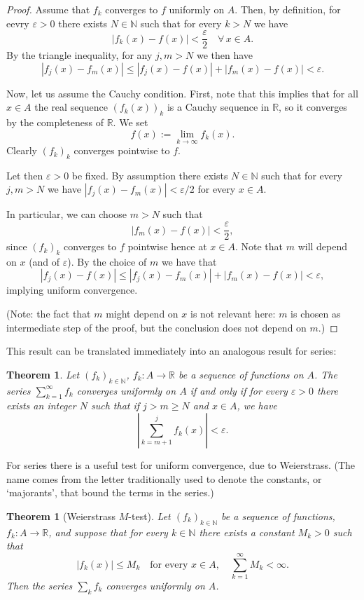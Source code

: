 \documentclass[a4paper,reqno]{amsart}
\numberwithin{equation}{section}
\newtheorem{theorem}[definition]{Theorem}
\def\N{\mathbb{N}}
\def\R{\mathbb{R}}
\begin{document}
\begin{proof}
Assume that $f_k$ converges to $f$ uniformly on $A$. Then, by definition, for eevry $\varepsilon>0$ there exists $N\in \N$ such that for every $k>N$ we have 
$$
|f_k(x) - f(x)|<\frac{\varepsilon}{2} \quad \forall \, x\in A.
$$
By the triangle inequality, for any $j,m>N$ we then have 
$$
|f_j(x) - f_m(x)|\leq |f_j(x) - f(x)| + |f_m(x) - f(x)| <\varepsilon.
$$

\medskip
Now, let us assume the Cauchy condition. First, note that this implies that for all $x\in A$ the real sequence $(f_k(x))_k$ is a Cauchy sequence in $\R$, so it converges by the completeness of $\R$. We set 
$$
f(x):= \lim_{k\to \infty} f_k(x).
$$
Clearly $(f_k)_k$ converges pointwise to $f$. 

Let then $\varepsilon>0$ be fixed. By assumption there exists $N\in \N$ such that for every $j,m>N$ we have $|f_j(x) - f_m(x)| <\varepsilon/2$ for every $x\in A$. 

In particular, we can choose $m>N$ such that 
$$
|f_m(x) - f(x)|<\frac{\varepsilon}{2},
$$ 
since $(f_k)_k$ converges to $f$ pointwise hence at $x\in A$. Note that $m$ will depend on $x$ (and of $\varepsilon$). By the choice of $m$ we have that 
$$
|f_j(x) - f(x)| \leq |f_j(x) - f_m(x)| + |f_m(x) - f(x)| <\varepsilon,
$$
implying uniform convergence.

(Note: the fact that $m$ might depend on $x$ is not relevant here: $m$ is chosen as intermediate step of the proof, but the conclusion does not depend on $m$.)

\end{proof} 

This result can be translated immediately into an analogous result for series:

\begin{theorem}\label{Cauchy:s}
Let $(f_k)_{k\in \mathbb{N}}$, $f_k:A\to \R$ be a sequence of functions on $A$. The series $\sum_{k=1}^\infty f_k$ converges uniformly on $A$ if and only if for every $\varepsilon>0$ there exists an integer $N$ such that if $j>m\geq N$ and $x\in A$, we have
$$
\left|\sum_{k=m+1}^jf_k(x)\right| < \varepsilon.
$$
\end{theorem}


For series there is a useful test for uniform convergence, due to Weierstrass. (The name comes from the letter traditionally used to denote the constants, or `majorants', that bound the terms in the series.)

\begin{theorem}[Weierstrass $M$-test]
Let $(f_k)_{k\in \mathbb{N}}$ be a sequence of functions, $f_k:A\to \R$, and suppose that for every $k\in \N$ there exists a constant $M_k>0$ such that
$$
|f_k(x)| \leq M_k \quad \textrm{for every } x\in A, \quad \sum_{k=1}^\infty M_k <\infty.
$$ 
Then the series $\sum_k f_k$ converges uniformly on $A$.
\end{theorem}
\end{document}
